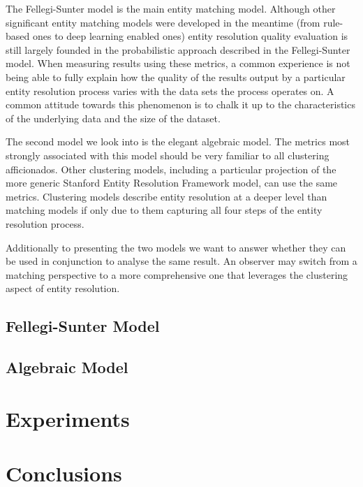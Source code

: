 \documentclass[journal]{IEEEtran}
\begin{document}
    The Fellegi-Sunter model is the main entity matching model.
    Although other significant entity matching models were developed in the
    meantime (from rule-based ones to deep learning enabled ones) entity
    resolution quality evaluation is still largely founded in the probabilistic
    approach described in the Fellegi-Sunter model.
    When measuring results using these metrics, a common experience is not being
    able to fully explain how the quality of the results output by a particular
    entity resolution process varies with the data sets the process operates on.
    A common attitude towards this phenomenon is to chalk it up to the
    characteristics of the underlying data and the size of the dataset.
    
    The second model we look into is the elegant algebraic model.
    The metrics most strongly associated with this model should be very familiar
    to all clustering afficionados.
    Other clustering models, including a particular projection of the more
    generic Stanford Entity Resolution Framework model, can use the same
    metrics.
    Clustering models describe entity resolution at a deeper level than matching
    models if only due to them capturing all four steps of the entity resolution
    process.

    Additionally to presenting the two models we want to answer whether they can
    be used in conjunction to analyse the same result.
    An observer may switch from a matching perspective to a more comprehensive
    one that leverages the clustering aspect of entity resolution.

    \subsection{Fellegi-Sunter Model}\label{subsec:Fellegi-Sunter Model}
    

    \subsection{Algebraic Model}\label{subsec:Algebraic Model}
    

    \section{Experiments}\label{sec:Experiments}
    

    \section{Conclusions}\label{sec:Conclusions}
\end{document}
